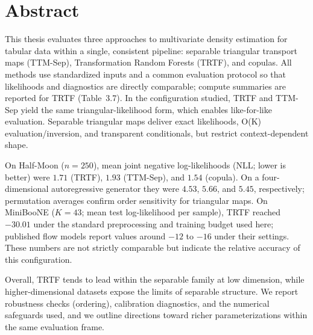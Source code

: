 \documentclass[11pt,a4paper,twoside]{book}\usepackage[]{graphicx}\usepackage[]{xcolor}
\begin{document}





\graphicspath{{./figure/}}
\frontmatter
{}
\setcounter{tocdepth}{1}

\chapter*{Abstract}

This thesis evaluates three approaches to multivariate density estimation for tabular data within a single, consistent pipeline: separable triangular transport maps (TTM-Sep), Transformation Random Forests (TRTF), and copulas. All methods use standardized inputs and a common evaluation protocol so that likelihoods and diagnostics are directly comparable; compute summaries are reported for TRTF (Table~3.7). In the configuration studied, TRTF and TTM-Sep yield the same triangular-likelihood form, which enables like-for-like evaluation. Separable triangular maps deliver exact likelihoods, O(K) evaluation/inversion, and transparent conditionals, but restrict context-dependent shape.


On Half-Moon ($n=250$), mean joint negative log-likelihoods (NLL; lower is better) were $1.71$ (TRTF), $1.93$ (TTM-Sep), and $1.54$ (copula). On a four-dimensional autoregressive generator they were $4.53$, $5.66$, and $5.45$, respectively; permutation averages confirm order sensitivity for triangular maps. On MiniBooNE ($K=43$; mean test log-likelihood per sample), TRTF reached $-30.01$ under the standard preprocessing and training budget used here; published flow models report values around $-12$ to $-16$ under their settings. These numbers are not strictly comparable but indicate the relative accuracy of this configuration.

Overall, TRTF tends to lead within the separable family at low dimension, while higher-dimensional datasets expose the limits of separable structure. We report robustness checks (ordering), calibration diagnostics, and the numerical safeguards used, and we outline directions toward richer parameterizations within the same evaluation frame.

\tableofcontents
{}

\cleardoublepage
\mainmatter




\end{document}
